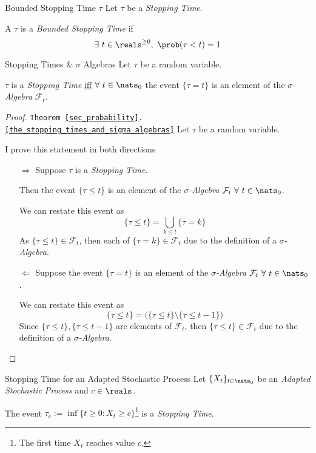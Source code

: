 \documentclass[11pt,a4paper]{article}
\begin{document}
  \begin{definition}{Bounded Stopping Time $\tau$}
    Let $\tau$ be a \textit{Stopping Time}.
    \par A $\tau$ is a \textit{Bounded Stopping Time} if
    \[ \exists\ t\in\reals^{\geq0},\ \prob(\tau<t)=1 \]
  \end{definition}

  \begin{theorem}{Stopping Times \& $\sigma$ Algebras}\label{the_stopping_times_and_sigma_algebras}
    Let $\tau$ be a random variable.
    \par $\tau$ is a \textit{Stopping Time} \underline{iff} $\forall\ t\in\nats_0$ the event $\{\tau=t\}$  is an element of the \textit{$\sigma$-Algebra} $\mathcal{F}_t$.
  \end{theorem}

  \begin{proof}{\texttt{Theorem \ref{sec_probability}.\ref{the_stopping_times_and_sigma_algebras}}}
    Let $\tau$ be a random variable.
    \par I prove this statement in both directions
    \begin{itemize}
      \item[$\Longrightarrow$] Suppose $\tau$ is a \textit{Stopping Time}.
      \par Then the event $\{\tau\leq t\}$ is an element of the \textit{$\sigma$-Algebra} $\mathcal{F}_t\ \forall\ t\in\nats_0$.
      \par We can restate this event as
      \[ \{\tau\leq t\}=\bigcup_{k\leq t}\{\tau=k\} \]
      As $\{\tau\leq t\}\in\mathcal{F}_t$, then each of $\{\tau=k\}\in\mathcal{F}_t$ due to the definition of a \textit{$\sigma$-Algebra}.

      \item[$\Longleftarrow$] Suppose the event $\{\tau=t\}$  is an element of the \textit{$\sigma$-Algebra} $\mathcal{F}_t\ \forall\ t\in\nats_0$.
      \par We can restate this event as
      \[ \{\tau\leq t\}=\big(\{\tau\leq t\}\setminus\{\tau\leq t-1\}\big) \]
      Since $\{\tau\leq t\},\{\tau\leq t-1\}$ are elements of $\mathcal{F}_t$, then $\{\tau\leq t\}\in\mathcal{F}_t$ due to the definition of a \textit{$\sigma$-Algebra}.
    \end{itemize}
    \proved
  \end{proof}

  \begin{theorem}{Stopping Time for an Adapted Stochastic Process}\label{the_stopping_time_adapted_stochastic_process}
    Let $\{X_t\}_{t\in\nats_0}$ be an \textit{Adapted Stochastic Process} and $c\in\reals$.
    \par The event $\tau_c:=\inf\{t\geq0:X_t\geq c\}$\footnote{The first time $X_t$ reaches value $c$.} is a \textit{Stopping Time}.
  \end{theorem}
\end{document}
